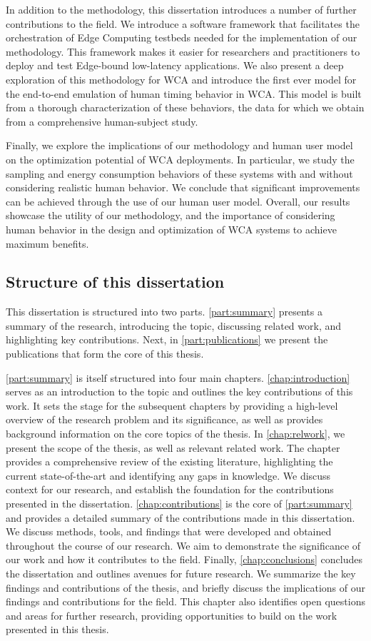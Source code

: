 In addition to the methodology, this dissertation introduces a number of further contributions to the field. 
We introduce a software framework that facilitates the orchestration of Edge Computing testbeds needed for the implementation of our methodology.
This framework makes it easier for researchers and practitioners to deploy and test Edge-bound low-latency applications.
We also present a deep exploration of this methodology for \gls{WCA} and introduce the first ever model for the end-to-end emulation of human timing behavior in \gls{WCA}.
This model is built from a thorough characterization of these behaviors, the data for which we obtain from a comprehensive human-subject study.

Finally, we explore the implications of our methodology and human user model on the optimization potential of \gls{WCA} deployments.
In particular, we study the sampling and energy consumption behaviors of these systems with and without considering realistic human behavior.
We conclude that significant improvements can be achieved through the use of our human user model.
Overall, our results showcase the utility of our methodology, and the importance of considering human behavior in the design and optimization of \gls{WCA} systems to achieve maximum benefits.

\subsection{Structure of this dissertation}

This dissertation is structured into two parts.
\cref{part:summary} presents a summary of the research, introducing the topic, discussing related work, and highlighting key contributions.
Next, in \cref{part:publications} we present the publications that form the core of this thesis.

\cref{part:summary} is itself structured into four main chapters.
\cref{chap:introduction} serves as an introduction to the topic and outlines the key contributions of this work.
It sets the stage for the subsequent chapters by providing a high-level overview of the research problem and its significance, as well as provides background information on the core topics of the thesis.
In \cref{chap:relwork}, we present the scope of the thesis, as well as relevant related work.
The chapter provides a comprehensive review of the existing literature, highlighting the current state-of-the-art and identifying any gaps in knowledge.
We discuss context for our research, and establish the foundation for the contributions presented in the dissertation.
\cref{chap:contributions} is the core of \cref{part:summary} and provides a detailed summary of the contributions made in this dissertation.
We discuss methods, tools, and findings that were developed and obtained throughout the course of our research.
We aim to demonstrate the significance of our work and how it contributes to the field.
Finally, \cref{chap:conclusions} concludes the dissertation and outlines avenues for future research.
We summarize the key findings and contributions of the thesis, and briefly discuss the implications of our findings and contributions for the field.
This chapter also identifies open questions and areas for further research, providing opportunities to build on the work presented in this thesis.